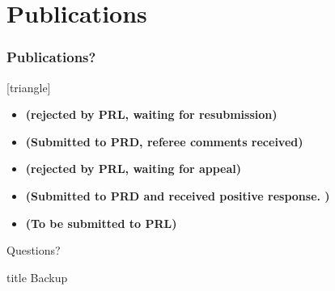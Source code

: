 \section*{Publications}
\begin{frame}
	\frametitle{Publications?}

	
	{
	[triangle]
	\begin{itemize}
		\item{} {\bf (rejected by PRL, waiting for resubmission)}
		
		\item{} {\bf (Submitted to PRD, referee comments received)}
		
		\item{} {\bf (rejected by PRL, waiting for appeal)}
	
		\item{} {\bf (Submitted to PRD and received positive response. )}
	
		\item{} {\bf (To be submitted to PRL)}
	\end{itemize}
	}

\end{frame}

\appendix
\begin{frame}[standout]
	\Huge Questions?
  \end{frame}

\appendix
\begin{frame}
	\vfill
	\centering
	\begin{beamercolorbox}[sep=8pt,center,shadow=true,rounded=true]{title}
		Backup\par%
	\end{beamercolorbox}
	\vfill
\end{frame}

\printbibliography

% 
% 


